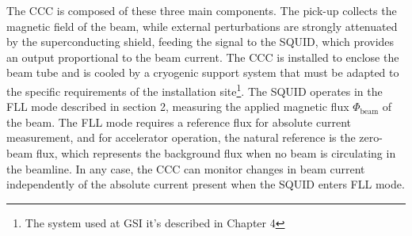 \documentclass[12pt,a4paper]{report}
\begin{document}
        The CCC is composed of these three main components. The pick-up collects the magnetic field of the beam, while external perturbations are strongly attenuated by the superconducting shield, feeding the signal to the SQUID, which provides an output proportional to the beam current. The CCC is installed to enclose the beam tube and is cooled by a cryogenic support system that must be adapted to the specific requirements of the installation site\footnote{The system used at GSI it's described in Chapter 4}. The SQUID operates in the FLL mode described in section 2, measuring the applied magnetic flux \( \Phi_{\text{beam}} \) of the beam. The FLL mode requires a reference flux for absolute current measurement, and for accelerator operation, the natural reference is the zero-beam flux, which represents the background flux when no beam is circulating in the beamline. In any case, the CCC can monitor changes in beam current independently of the absolute current present when the SQUID enters FLL mode.
\end{document}
